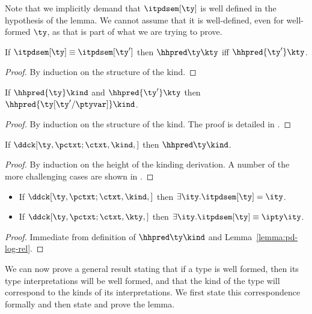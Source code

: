 Note that we implicitly demand that $\itpdsem[\ty]$ is well defined in
the hypothesis of the lemma. We cannot assume that it is well-defined,
even for well-formed $\ty$, as that is part of what we are trying to
prove.

\begin{lemma}
  If $\itpdsem[\ty] \equiv \itpdsem[\ty']$ then $\hhpred \ty \kty$ iff $\hhpred {\ty'} \kty$.
\label{lemma:eq-preserve-H}
\end{lemma}
\begin{proof}
  By induction on the structure of the kind.
\end{proof}

\begin{lemma}
  If $\hhpred {\ty} \kind$ and $\hhpred {\ty'} \kty$ then $\hhpred {\ty[\ty'/\ptyvar]} \kind$.
\label{lemma:hh-subst}
\label{lemma:sub-preserve-H}
\end{lemma}
\begin{proof}
  By induction on the structure of the kind.  The proof is detailed in
  .
\end{proof}

\begin{lemma}
\label{lemma:pd-log-rel}
If $\ddck[\ty,{\pctxt;\ctxt},\kind,{}]$ then $\hhpred \ty \kind$.
\end{lemma}

\begin{proof}
  By induction on the height of the kinding derivation. A number of
  the more challenging cases are shown in .
\end{proof}

\begin{corollary}
\label{cor:pd-props}
  \begin{itemize}
  \item If $\ddck[\ty,\pctxt;\ctxt,\kind,{}]$ then $\exists
     \ity.\itpdsem[\ty] = \ity$.
   \item If $\ddck[\ty,\pctxt;\ctxt,\kty,{}]$ then $\exists
     \ity.\itpdsem[\ty] \equiv \ipty \ity$.
  \end{itemize}
\end{corollary}

\begin{proof}
  Immediate from definition of $\hhpred \ty \kind$ and
  Lemma~\ref{lemma:pd-log-rel}.
\end{proof}

We can now prove a general result stating that if a type is well
formed, then its type interpretations will be well formed, and that
the kind of the type will correspond to the kinds of its
interpretations. We first state this correspondence formally and then
state and prove the lemma.

